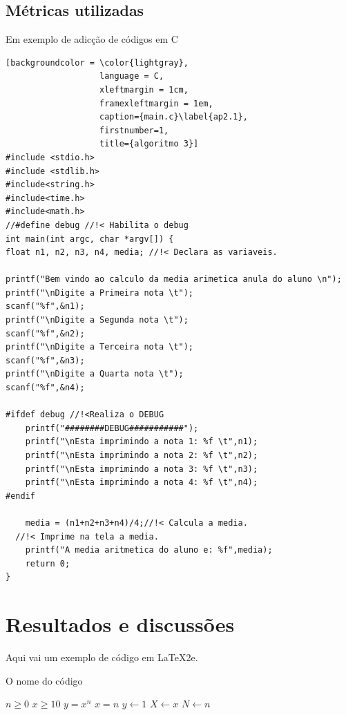 \subsection{Métricas utilizadas}
\par Em exemplo de adicção de códigos em C
\begin{lstlisting}[backgroundcolor = \color{lightgray},
                   language = C,
                   xleftmargin = 1cm,
                   framexleftmargin = 1em,
                   caption={main.c}\label{ap2.1},
                   firstnumber=1,
                   title={algoritmo 3}]
#include <stdio.h>
#include <stdlib.h>
#include<string.h>
#include<time.h>
#include<math.h>
//#define debug //!< Habilita o debug
int main(int argc, char *argv[]) {
float n1, n2, n3, n4, media; //!< Declara as variaveis.

printf("Bem vindo ao calculo da media arimetica anula do aluno \n");
printf("\nDigite a Primeira nota \t");
scanf("%f",&n1);
printf("\nDigite a Segunda nota \t");
scanf("%f",&n2);
printf("\nDigite a Terceira nota \t");
scanf("%f",&n3);
printf("\nDigite a Quarta nota \t");
scanf("%f",&n4);

#ifdef debug //!<Realiza o DEBUG
	printf("########DEBUG###########");
	printf("\nEsta imprimindo a nota 1: %f \t",n1);
	printf("\nEsta imprimindo a nota 2: %f \t",n2);
	printf("\nEsta imprimindo a nota 3: %f \t",n3);
	printf("\nEsta imprimindo a nota 4: %f \t",n4);
#endif

	media = (n1+n2+n3+n4)/4;//!< Calcula a media.
  //!< Imprime na tela a media.
	printf("A media aritmetica do aluno e: %f",media);
	return 0;
}

\end{lstlisting}

\section{Resultados e discussões}

\par Aqui vai um exemplo de código em \LaTeX2e.

\begin{algorithm} [H]
	\caption{O nome do código}\label{alg:cap}

	\begin{algorithmic} [H]
		\Require $n \geq 0$	
    \Require $x \geq 10$	
		\Ensure $y = x^n$   	
    \Ensure $x = n $      
		\State $y \gets 1$
		\State $X \gets x$
		\State $N \gets n$
	\end{algorithmic}

\end{algorithm}

